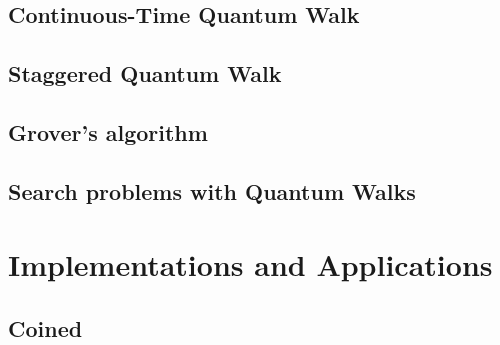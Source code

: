 \documentclass[
oneside,
11pt, a4paper,
footinclude=true,
headinclude=true,
cleardoublepage=empty
]{scrbook}
\begin{document}
\section{Continuous-Time Quantum Walk}\label{sec:chap3Contwalk}

\section{Staggered Quantum Walk}\label{sec:chap3StagWalk}

\section{Grover's algorithm}

\section{Search problems with Quantum Walks}\label{sec:chap3Search}


\chapter{Implementations and Applications}
\section{Coined}\label{coinedQWQiskit}

\end{document}
